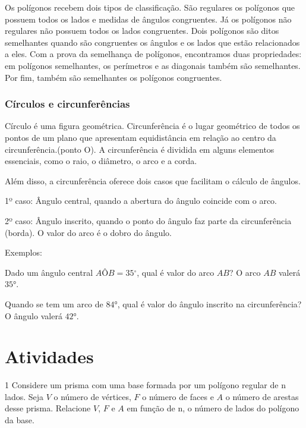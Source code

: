 {Os polígonos recebem dois tipos de classificação. São regulares os
polígonos que possuem todos os lados e medidas de ângulos congruentes.
Já os polígonos não regulares não possuem todos os lados congruentes.
Dois polígonos são ditos semelhantes quando são congruentes os ângulos e
os lados que estão relacionados a eles. Com a prova da semelhança de
polígonos, encontramos duas propriedades: em polígonos semelhantes, os
perímetros e as diagonais também são semelhantes. Por fim, também são
semelhantes os polígonos congruentes.

\subsubsection{Círculos e circunferências}

Círculo é uma figura geométrica. Circunferência é o lugar geométrico de
todos os pontos de um plano que apresentam equidistância em relação ao
centro da circunferência.(ponto O). A circunferência é dividida em
alguns elementos essenciais, como o raio, o diâmetro, o arco e a corda.

Além disso, a circunferência oferece dois casos que facilitam o cálculo
de ângulos.

1º caso: Ângulo central, quando a abertura do ângulo coincide com o
arco.

2º caso: Ângulo inscrito, quando o ponto do ângulo faz parte da
circunferência (borda). O valor do arco é o dobro do ângulo.

\medskip \noindent  Exemplos:

Dado um ângulo central $AÔB = 35{^\circ}$, qual é valor do arco $AB$?
O arco $AB$ valerá $35°$.

Quando se tem um arco de $84°$, qual é valor do ângulo inscrito na
circunferência? O ângulo valerá $42°$.
}

\section*{Atividades}\enlargethispage{4\baselineskip}

\num{1} Considere um prisma com uma base formada por um polígono regular de n
lados. Seja $V$ o número de vértices, $F$ o número de faces e $A$ o número de
arestas desse prisma.
Relacione $V$, $F$ e $A$ em função de n, o número de lados do polígono da
base.

